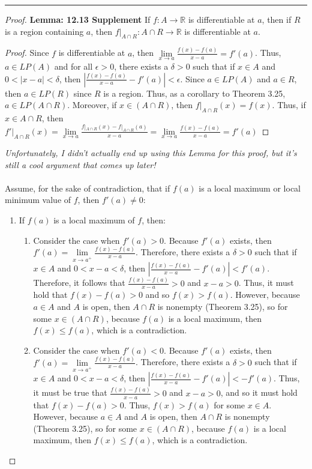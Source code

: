 \documentclass[openany, amssymb, psamsfonts]{amsart}
\newcommand{\bbR}{\mathbb{R}}
\theoremstyle{definition}
\numberwithin{equation}{section}
\begin{document}
\vspace{4pt}     \hrule   \vspace{4pt}\begin{proof}
\textbf{Lemma: 12.13 Supplement} If $f: A \to \bbR$ is differentiable at $a$, then if $R$ is a region containing $a$, then $f|_{A\cap R}: A\cap R \to \bbR$ is differentiable at $a$. 
\begin{proof}
    Since $f$ is differentiable at $a$, then $\lim\limits_{x\to a}\frac{f(x)-f(a)}{x-a} = f'(a)$. Thus, $a\in LP(A)$ and for all $\epsilon>0$, there exists a $\delta>0$ such that if $x\in A$ and $0<|x-a|<\delta$, then $|\frac{f(x) - f(a)}{x-a} - f'(a)|< \epsilon$. Since $a\in LP(A)$ and $a\in R$, then $a\in LP(R)$ since $R$ is a region. Thus, as a corollary to Theorem 3.25, $a\in LP(A\cap R)$. Moreover, if $x\in (A\cap R)$, then $f|_{A\cap R}(x) = f(x)$. Thus, if $x\in A\cap R$, then $f'|_{A\cap R}(x) = \lim\limits_{x\to a}\frac{f|_{A\cap R}(x) - f|_{A\cap R}(a)}{x-a} = \lim\limits_{x\to a}\frac{f(x) - f(a)}{x-a} = f'(a)$
\end{proof}
\textit{Unfortunately, I didn't actually end up using this Lemma for this proof, but it's still a cool argument that comes up later!}\\\\
Assume, for the sake of contradiction, that if $f(a)$ is a local maximum or local minimum value of $f$, then $f'(a) \neq 0$:
\begin{enumerate}
    \item If $f(a)$ is a local maximum of $f$, then:
    \begin{enumerate}
        \item Consider the case when $f'(a)>0$. Because $f'(a)$ exists, then $f'(a) = \lim\limits_{x\to a^+}\frac{f(x) - f(a)}{x-a}$. Therefore, there exists a $\delta>0$ such that if $x\in A$ and $0<x-a<\delta$, then $|\frac{f(x)- f(a)}{x-a} - f'(a)| < f'(a)$. Therefore, it follows that $\frac{f(x) - f(a)}{x-a} >0$ and $x-a>0$. Thus, it must hold that $f(x) - f(a) > 0$ and so $f(x)>f(a)$. However, because $a\in A$ and $A$ is open, then $A\cap R$ is nonempty (Theorem 3.25), so for some $x\in (A\cap R)$, because $f(a)$ is a local maximum, then $f(x) \leq f(a)$, which is a contradiction. 
        \item Consider the case when $f'(a)< 0$. Because $f'(a)$ exists, then $f'(a) =  \lim\limits_{x\to a^+}\frac{f(x) - f(a)}{x-a}$. Therefore, there exists a $\delta>0$ such that if $x\in A$ and $0<x-a<\delta$, then $|\frac{f(x)- f(a)}{x-a} - f'(a)| < -f'(a)$. Thus, it must be true that $\frac{f(x) - f(a)}{x-a}>0$ and $x-a>0$, and so it must hold that $f(x) - f(a) > 0$. Thus, $f(x) > f(a)$ for some $x\in A$. However, because $a\in A$ and $A$ is open, then $A\cap R$ is nonempty (Theorem 3.25), so for some $x\in (A\cap R)$, because $f(a)$ is a local maximum, then $f(x) \leq f(a)$, which is a contradiction.  

\end{enumerate}
\end{enumerate}
\end{proof}
\end{document}
